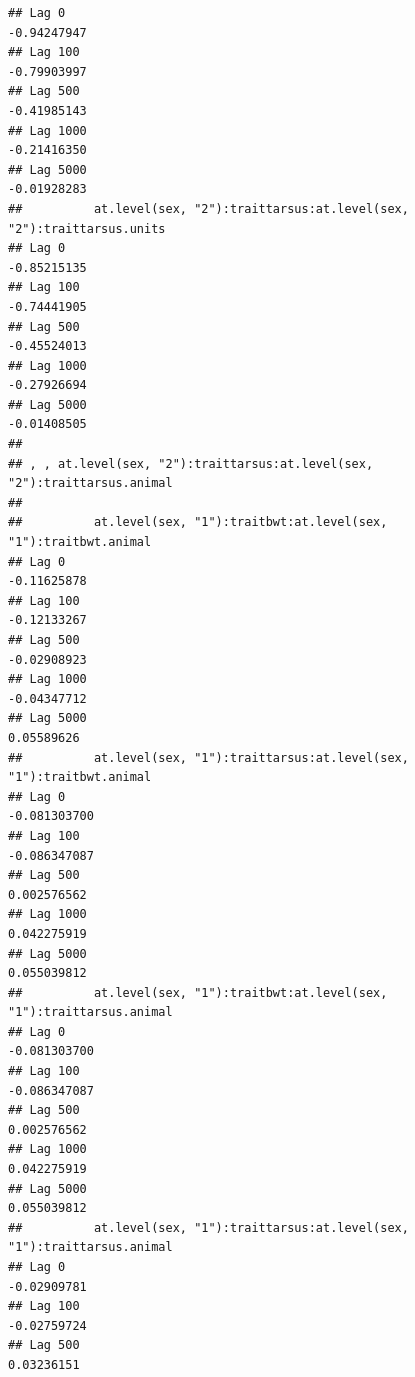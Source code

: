 \documentclass[
  12pt,
]{book}
\begin{document}
\begin{verbatim}
## Lag 0                                                         -0.94247947
## Lag 100                                                       -0.79903997
## Lag 500                                                       -0.41985143
## Lag 1000                                                      -0.21416350
## Lag 5000                                                      -0.01928283
##          at.level(sex, "2"):traittarsus:at.level(sex, "2"):traittarsus.units
## Lag 0                                                            -0.85215135
## Lag 100                                                          -0.74441905
## Lag 500                                                          -0.45524013
## Lag 1000                                                         -0.27926694
## Lag 5000                                                         -0.01408505
## 
## , , at.level(sex, "2"):traittarsus:at.level(sex, "2"):traittarsus.animal
## 
##          at.level(sex, "1"):traitbwt:at.level(sex, "1"):traitbwt.animal
## Lag 0                                                       -0.11625878
## Lag 100                                                     -0.12133267
## Lag 500                                                     -0.02908923
## Lag 1000                                                    -0.04347712
## Lag 5000                                                     0.05589626
##          at.level(sex, "1"):traittarsus:at.level(sex, "1"):traitbwt.animal
## Lag 0                                                         -0.081303700
## Lag 100                                                       -0.086347087
## Lag 500                                                        0.002576562
## Lag 1000                                                       0.042275919
## Lag 5000                                                       0.055039812
##          at.level(sex, "1"):traitbwt:at.level(sex, "1"):traittarsus.animal
## Lag 0                                                         -0.081303700
## Lag 100                                                       -0.086347087
## Lag 500                                                        0.002576562
## Lag 1000                                                       0.042275919
## Lag 5000                                                       0.055039812
##          at.level(sex, "1"):traittarsus:at.level(sex, "1"):traittarsus.animal
## Lag 0                                                             -0.02909781
## Lag 100                                                           -0.02759724
## Lag 500                                                            0.03236151

\end{verbatim}
\end{document}
